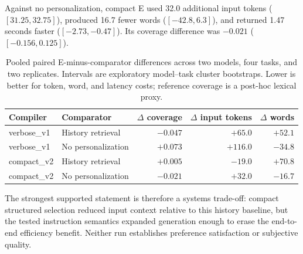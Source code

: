 Against no personalization, compact E used 32.0 additional input tokens
($[31.25,32.75]$), produced 16.7 fewer words ($[-42.8,6.3]$), and returned 1.47
seconds faster ($[-2.73,-0.47]$). Its coverage difference was $-0.021$
($[-0.156,0.125]$).

\begin{table}[t]
  \centering
  \small
  \caption{Pooled paired E-minus-comparator differences across two models, four
  tasks, and two replicates. Intervals are exploratory model--task cluster
  bootstraps. Lower is better for token, word, and latency costs; reference
  coverage is a post-hoc lexical proxy.}
  \label{tab:pilot-results}
  \begin{tabular}{llrrr}
    \toprule
    Compiler & Comparator & $\Delta$ coverage & $\Delta$ input tokens &
    $\Delta$ words \\
    \midrule
    verbose\_v1 & History retrieval & $-0.047$ & $+65.0$ & $+52.1$ \\
    verbose\_v1 & No personalization & $+0.073$ & $+116.0$ & $-34.8$ \\
    compact\_v2 & History retrieval & $+0.005$ & $-19.0$ & $+70.8$ \\
    compact\_v2 & No personalization & $-0.021$ & $+32.0$ & $-16.7$ \\
    \bottomrule
  \end{tabular}
\end{table}

The strongest supported statement is therefore a systems trade-off: compact
structured selection reduced input context relative to this history baseline, but
the tested instruction semantics expanded generation enough to erase the end-to-end
efficiency benefit. Neither run establishes preference satisfaction or subjective
quality.
